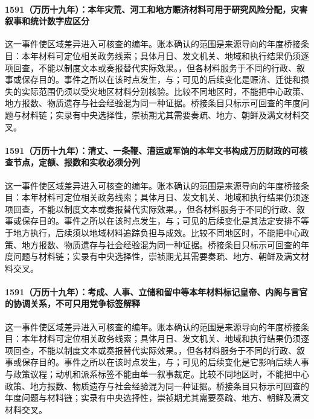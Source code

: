 \paragraph{1591（万历十九年）：本年灾荒、河工和地方赈济材料可用于研究风险分配，灾害叙事和统计数字应区分} 这一事件使区域差异进入可核查的编年。账本确认的范围是来源导向的年度桥接条目：本年材料可定位相关政务线索；具体月日、发文机关、地域和执行结果仍须逐项回查，不能以制度文本或奏报替代实际效果。，但各材料服务于不同的行政、叙事或保存目的。事件之所以在该时点发生，与；可见的后续变化是赈济、迁徙和损失的实际范围仍须以受灾地区材料分别核验。比较不同地区时，不能把中心政策、地方报数、物质遗存与社会经验混为同一种证据。桥接条目只标示可回查的年度问题与材料链；实录有中央选择性，崇祯期尤其需要奏疏、地方、朝鲜及满文材料交叉。

\paragraph{1591（万历十九年）：清丈、一条鞭、漕运或军饷的本年文书构成万历财政的可核查节点，定额、报数和实收必须分列} 这一事件使区域差异进入可核查的编年。账本确认的范围是来源导向的年度桥接条目：本年材料可定位相关政务线索；具体月日、发文机关、地域和执行结果仍须逐项回查，不能以制度文本或奏报替代实际效果。，但各材料服务于不同的行政、叙事或保存目的。事件之所以在该时点发生，与；可见的后续变化是其法定安排不等于地方执行，后续须以地域材料追踪负担与成效。比较不同地区时，不能把中心政策、地方报数、物质遗存与社会经验混为同一种证据。桥接条目只标示可回查的年度问题与材料链；实录有中央选择性，崇祯期尤其需要奏疏、地方、朝鲜及满文材料交叉。

\paragraph{1591（万历十九年）：考成、人事、立储和留中等本年材料标记皇帝、内阁与言官的协调关系，不可只用党争标签解释} 这一事件使区域差异进入可核查的编年。账本确认的范围是来源导向的年度桥接条目：本年材料可定位相关政务线索；具体月日、发文机关、地域和执行结果仍须逐项回查，不能以制度文本或奏报替代实际效果。，但各材料服务于不同的行政、叙事或保存目的。事件之所以在该时点发生，与；可见的后续变化是它影响后续人事与政策议程；动机和派系标签不能由单一叙事裁定。比较不同地区时，不能把中心政策、地方报数、物质遗存与社会经验混为同一种证据。桥接条目只标示可回查的年度问题与材料链；实录有中央选择性，崇祯期尤其需要奏疏、地方、朝鲜及满文材料交叉。

